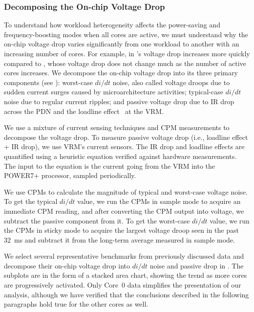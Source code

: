 \subsubsection{Decomposing the On-chip Voltage Drop}
\label{sec:ams:rootcause:vdrop-decompose}

To understand how workload heterogeneity affects the power-saving and frequency-boosting modes when all cores are active, we must understand why the on-chip voltage drop varies significantly from one workload to another with an increasing number of cores. For example, in  's voltage drop increases more quickly compared to , whose voltage drop does not change much as the number of active cores increases.  We decompose the on-chip voltage drop into its three primary components (see ): worst-case $di/dt$ noise, also called voltage droops due to sudden current surges caused by microarchitecture activities; typical-case $di/dt$ noise due to regular current ripples; and passive voltage drop due to IR drop across the PDN and the loadline effect~\cite{lefurgy2011active} at the VRM.

We use a mixture of current sensing techniques and CPM measurements to decompose the voltage drop. To measure passive voltage drop (i.e., loadline effect + IR drop), we use VRM's current sensors. The IR drop and loadline effects are quantified using a heuristic equation verified against hardware measurements. The input to the equation is the current going from the VRM into the POWER7+ processor, sampled periodically.

We use CPMs to calculate the magnitude of typical and worst-case voltage noise. To get the typical $di/dt$ value, we run the CPMs in sample mode to acquire an immediate CPM reading, and after converting the CPM output into voltage, we subtract the passive component from it. To get the worst-case $di/dt$ value, we run the CPMs in sticky mode to acquire the largest voltage droop seen in the past 32~ms and subtract it from the long-term average measured in sample mode. 

We select several representative benchmarks from previously discussed data and decompose their on-chip voltage drop into $di/dt$ noise and passive drop in . The subplots are in the form of a stacked area chart, showing the trend as more cores are progressively activated. Only Core~0 data simplifies the presentation of our analysis, although we have verified that the conclusions described in the following paragraphs hold true for the other cores as well.

